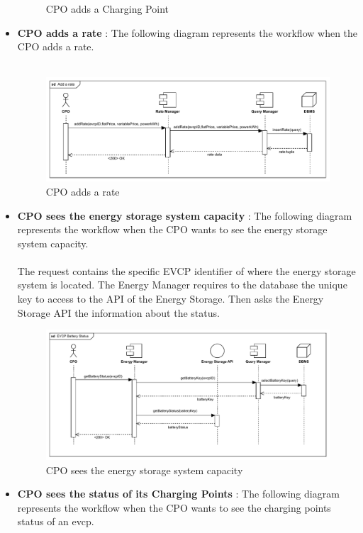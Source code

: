 \begin{itemize}
\begin{figure}[H]
        \caption{CPO adds a Charging Point}
    \end{figure}
    \item \textbf{CPO adds a rate} : The following diagram represents the workflow when the CPO adds a rate.\\
    \\
    \begin{figure}[H]
        \centering
        \includegraphics[scale=0.55]{src/runtimeVIew/CPMS_addRate.pdf}
        \caption{CPO adds a rate}
    \end{figure}
    \pagebreak
    \item \textbf{CPO sees the energy storage system capacity} : The following diagram represents the workflow when the CPO wants to see the energy storage system capacity.\\
    \\ The request contains the specific EVCP identifier of where the energy storage system is located. The Energy Manager requires to the database the unique key to access
    to the API of the Energy Storage. Then asks the Energy Storage API the information about the status.
    \begin{figure}[H]
        \centering
        \includegraphics[scale=0.55]{src/runtimeVIew/CPMS_batteryCapacity.pdf}
        \caption{CPO sees the energy storage system capacity}
    \end{figure}
    \item \textbf{CPO sees the status of its Charging Points} : The following diagram represents the workflow when the CPO wants to see the charging points status of an evcp.\\

\end{itemize}
